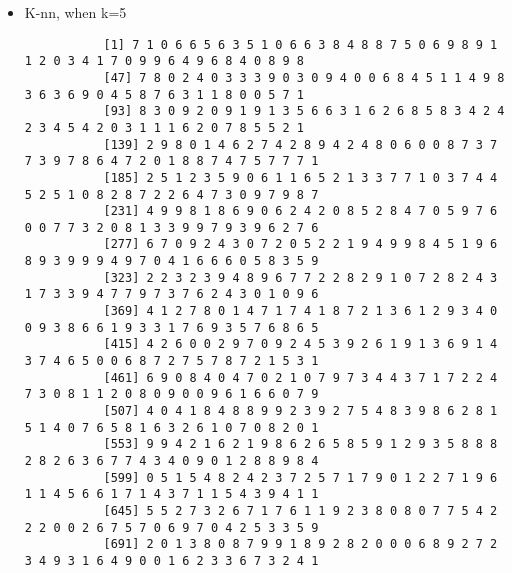 \documentclass{article}
\begin{document}
\begin{itemize}
\begin{scriptsize}
\begin{verbatim}
	[3446] 9 0 2 4 6 1 0 0 9 4 0 7 7 6 5 2 5 1 2 9 5 4 5 8 8 9 7 5 9 1 6 7 7 7 8 5 3 2 3 6 0 1 9 8 0 7 2 1 5 1 1 4 0
	[3499] 7 7 4 9 5 5 1 4 4 3 3 9 2 7 7 1 4 0 3 5 6 0 8 4 0 8 5 6 5 7 3 0 4 1 5 7 3 2 6 6 7 7 1 2 2 6 9 0 7 8 1 0 4
	[3552] 1 7 8 3 9 2 7 0 1 8 6 2 8 5 6 9 7 7 4 4 5 0 8 7 7 0 2 3 7 6 4 8 3 1 3 6 2 9 3 7 8 5 6 4 9 1 3 0 3 4 3 0 2
	[3605] 7 9 0 7 7 3 5 5 3 7 2 3 1 7 7 8 4 0 6 7 4 0 0 5 1 7 1 1 6 6 8 8 9 9 8 7 3 4 4 4 3 9 2 4 3 1 2 3 3 1 0 1 6
	[3658] 3 4 6 7 3 4 5 8 2 7 6 0 9 6 0 1 7 1 8 9 8 7 1 5 4 4 8 1 4 1 6 6 0 3 5 7 2 7 5 4 1 2 0 1 9 0 2 6 4 8 9 3 3
	[3711] 0 3 5 9 4 3 0 3 7 7 0 3 3 3 1 1 1 3 6 8 4 2 7 6 4 1 9 2 6 3 9 0 5 4 5 1 7
	\end{verbatim}

 	\end{scriptsize}
	\item K-nn, when k=5\\
	\begin{scriptsize}
		\begin{verbatim}
		   [1] 7 1 0 6 6 5 6 3 5 1 0 6 6 3 8 4 8 8 7 5 0 6 9 8 9 1 1 2 0 3 4 1 7 0 9 9 6 4 9 6 8 4 0 8 9 8
		   [47] 7 8 0 2 4 0 3 3 3 9 0 3 0 9 4 0 0 6 8 4 5 1 1 4 9 8 3 6 3 6 9 0 4 5 8 7 6 3 1 1 8 0 0 5 7 1
		   [93] 8 3 0 9 2 0 9 1 9 1 3 5 6 6 3 1 6 2 6 8 5 8 3 4 2 4 2 3 4 5 4 2 0 3 1 1 1 6 2 0 7 8 5 5 2 1
		   [139] 2 9 8 0 1 4 6 2 7 4 2 8 9 4 2 4 8 0 6 0 0 8 7 3 7 7 3 9 7 8 6 4 7 2 0 1 8 8 7 4 7 5 7 7 7 1
		   [185] 2 5 1 2 3 5 9 0 6 1 1 6 5 2 1 3 3 7 7 1 0 3 7 4 4 5 2 5 1 0 8 2 8 7 2 2 6 4 7 3 0 9 7 9 8 7
		   [231] 4 9 9 8 1 8 6 9 0 6 2 4 2 0 8 5 2 8 4 7 0 5 9 7 6 0 0 7 7 3 2 0 8 1 3 3 9 9 7 9 3 9 6 2 7 6
		   [277] 6 7 0 9 2 4 3 0 7 2 0 5 2 2 1 9 4 9 9 8 4 5 1 9 6 8 9 3 9 9 9 4 9 7 0 4 1 6 6 6 0 5 8 3 5 9
		   [323] 2 2 3 2 3 9 4 8 9 6 7 7 2 2 8 2 9 1 0 7 2 8 2 4 3 1 7 3 3 9 4 7 7 9 7 3 7 6 2 4 3 0 1 0 9 6
		   [369] 4 1 2 7 8 0 1 4 7 1 7 4 1 8 7 2 1 3 6 1 2 9 3 4 0 0 9 3 8 6 6 1 9 3 3 1 7 6 9 3 5 7 6 8 6 5
		   [415] 4 2 6 0 0 2 9 7 0 9 2 4 5 3 9 2 6 1 9 1 3 6 9 1 4 3 7 4 6 5 0 0 6 8 7 2 7 5 7 8 7 2 1 5 3 1
		   [461] 6 9 0 8 4 0 4 7 0 2 1 0 7 9 7 3 4 4 3 7 1 7 2 2 4 7 3 0 8 1 1 2 0 8 0 9 0 0 9 6 1 6 6 0 7 9
		   [507] 4 0 4 1 8 4 8 8 9 9 2 3 9 2 7 5 4 8 3 9 8 6 2 8 1 5 1 4 0 7 6 5 8 1 6 3 2 6 1 0 7 0 8 2 0 1
		   [553] 9 9 4 2 1 6 2 1 9 8 6 2 6 5 8 5 9 1 2 9 3 5 8 8 8 2 8 2 6 3 6 7 7 4 3 4 0 9 0 1 2 8 8 9 8 4
		   [599] 0 5 1 5 4 8 2 4 2 3 7 2 5 7 1 7 9 0 1 2 2 7 1 9 6 1 1 4 5 6 6 1 7 1 4 3 7 1 1 5 4 3 9 4 1 1
		   [645] 5 5 2 7 3 2 6 7 1 7 6 1 1 9 2 3 8 0 8 0 7 7 5 4 2 2 2 0 0 2 6 7 5 7 0 6 9 7 0 4 2 5 3 3 5 9
		   [691] 2 0 1 3 8 0 8 7 9 9 1 8 9 2 8 2 0 0 0 6 8 9 2 7 2 3 4 9 3 1 6 4 9 0 0 1 6 2 3 3 6 7 3 2 4 1

\end{verbatim}
\end{scriptsize}
\end{itemize}
\end{document}
